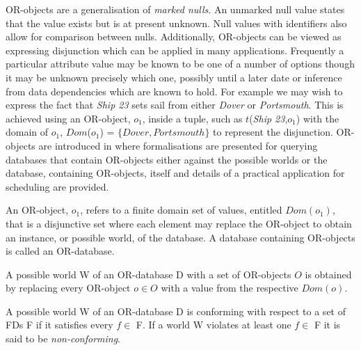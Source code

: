 OR-objects \cite{inv91} are a generalisation of {\em marked nulls}. An
unmarked null 
value states that the value exists but is at present
unknown. Null values with identifiers also allow for comparison between nulls.
Additionally, OR-objects can be viewed as expressing disjunction which
can be applied in many applications.  Frequently a particular
attribute value may be known to be one of a number of options though
it may be unknown precisely which one, possibly until a later date or
inference from data dependencies which are known to hold.  For example
we may wish to express the
fact that {\em Ship 23} sets sail from either {\em Dover} or {\em
Portsmouth}.  This is achieved using an OR-object, $o_1$, inside a
tuple, such as $t$({\em Ship 23},$o_1$) with the domain of $o_1$,
$Dom$($o_1$) = $\{Dover, Portsmouth\}$ to represent the disjunction.
OR-objects are introduced in \cite{inv91} where formalisations are
presented for querying databases that contain OR-objects either
against the possible worlds or the database, containing OR-objects,
itself and details of a practical application for scheduling are provided. 

\begin{definition}[OR-Object]
\begin{rm}
An OR-object, $o_1$, refers to a finite domain set of values, entitled
$Dom(o_1)$, that is a disjunctive set where each element may replace
the OR-object to obtain an instance, or possible world, of the
database. A database containing OR-objects is called an OR-database.
\end{rm}
\end{definition}


\begin{definition}
\begin{rm}
A possible world W of an OR-database  D with a set of OR-objects $O$
is obtained by replacing every OR-object $o \in O$ with a value from the
respective $Dom(o)$.
\end{rm}
\end{definition}

\begin{definition}
\begin{rm}
A possible world W of an OR-database D is conforming with respect to a set of
FDs F if it satisfies every $f \in$ F.  If a world W violates
at least one $f \in$ F it is said to be {\em non-conforming}.
\end{rm}
\end{definition}

